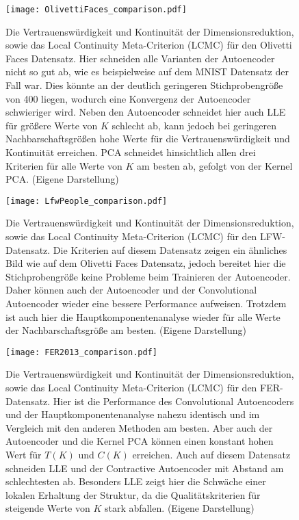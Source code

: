 \begin{figure}[ht]
	\begin{center}
		\texttt{[image: OlivettiFaces\_comparison.pdf]}
	\end{center}
	\caption[Qualitätskriterien für den Olivetti Faces-Datensatz]{Die Vertrauenswürdigkeit und Kontinuität der Dimensionsreduktion, sowie das Local Continuity Meta-Criterion (LCMC) für den Olivetti Faces Datensatz. Hier schneiden alle Varianten der Autoencoder nicht so gut ab, wie es beispielweise auf dem MNIST Datensatz der Fall war. Dies könnte an der deutlich geringeren Stichprobengröße von 400 liegen, wodurch eine Konvergenz der Autoencoder schwieriger wird. Neben den Autoencoder schneidet hier auch LLE für größere Werte von $K$ schlecht ab, kann jedoch bei geringeren Nachbarschaftsgrößen hohe Werte für die Vertrauenswürdigkeit und Kontinuität erreichen. PCA schneidet hinsichtlich allen drei Kriterien für alle Werte von $K$ am besten ab, gefolgt von der Kernel PCA. (Eigene Darstellung)}
	\label{fig:OlivettiFacesMetrics}
\end{figure}

\begin{figure}[ht]
	\begin{center}
		\texttt{[image: LfwPeople\_comparison.pdf]}
	\end{center}
	\caption[Qualitätskriterien für den LFW-Datensatz]{Die Vertrauenswürdigkeit und Kontinuität der Dimensionsreduktion, sowie das Local Continuity Meta-Criterion (LCMC) für den LFW-Datensatz. Die Kriterien auf diesem Datensatz zeigen ein ähnliches Bild wie auf dem Olivetti Faces Datensatz, jedoch bereitet hier die Stichprobengröße keine Probleme beim Trainieren der Autoencoder. Daher können auch der Autoencoder und der Convolutional Autoencoder wieder eine bessere Performance aufweisen. Trotzdem ist auch hier die Hauptkomponentenanalyse wieder für alle Werte der Nachbarschaftsgröße am besten. (Eigene Darstellung)}
	\label{fig:LfwPeopleMetrics}
\end{figure}

\begin{figure}[ht]
	\begin{center}
		\texttt{[image: FER2013\_comparison.pdf]}
	\end{center}
	\caption[Qualitätskriterien für den FER-Datensatz]{Die Vertrauenswürdigkeit und Kontinuität der Dimensionsreduktion, sowie das Local Continuity Meta-Criterion (LCMC) für den FER-Datensatz. Hier ist die Performance des Convolutional Autoencoders und der Hauptkomponentenanalyse nahezu identisch und im Vergleich mit den anderen Methoden am besten. Aber auch der Autoencoder und die Kernel PCA können einen konstant hohen Wert für $T(K)$ und $C(K)$ erreichen. Auch auf diesem Datensatz schneiden LLE und der Contractive Autoencoder mit Abstand am schlechtesten ab. Besonders LLE zeigt hier die Schwäche einer lokalen Erhaltung der Struktur, da die Qualitätskriterien für steigende Werte von $K$ stark abfallen. (Eigene Darstellung)}
	\label{fig:FER2013Metrics}
\end{figure}
